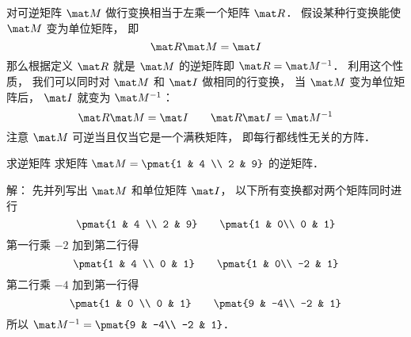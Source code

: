

对可逆矩阵 $\mat M$ 做行变换相当于左乘一个矩阵 $\mat R$． 假设某种行变换能使 $\mat M$ 变为单位矩阵， 即
\begin{equation}
\mat R \mat M = \mat I
\end{equation}
那么根据定义 $\mat R$ 就是 $\mat M$ 的逆矩阵即 $\mat R = \mat M^{-1}$． 利用这个性质， 我们可以同时对 $\mat M$ 和 $\mat I$ 做相同的行变换， 当 $\mat M$ 变为单位矩阵后， $\mat I$ 就变为 $\mat M^{-1}$：
\begin{equation}
\mat R\mat M = \mat I
\qquad
\mat R \mat I = \mat M^{-1}
\end{equation}
注意 $\mat M$ 可逆当且仅当它是一个满秩矩阵， 即每行都线性无关的方阵．

\begin{example}{求逆矩阵}
求矩阵 $\mat M = \pmat{1 & 4 \\ 2 & 9}$ 的逆矩阵．

解： 先并列写出 $\mat M$ 和单位矩阵 $\mat I$， 以下所有变换都对两个矩阵同时进行
\begin{equation}
\pmat{1 & 4 \\ 2 & 9} \qquad \pmat{1 & 0\\ 0 & 1}
\end{equation}
第一行乘 $-2$ 加到第二行得
\begin{equation}
\pmat{1 & 4 \\ 0 & 1} \qquad \pmat{1 & 0\\ -2 & 1}
\end{equation}
第二行乘 $-4$ 加到第一行得
\begin{equation}
\pmat{1 & 0 \\ 0 & 1} \qquad \pmat{9 & -4\\ -2 & 1}
\end{equation}
所以 $\mat M^{-1} = \pmat{9 & -4\\ -2 & 1}$．
\end{example}
